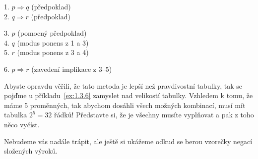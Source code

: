 
\begin{solution}
  \begin{proofbox}
    1. $p \Rightarrow q$ (předpoklad) \\
    2. $q \Rightarrow r$ (předpoklad) 
  \begin{proofbox}
    3. $p$ (pomocný předpoklad) \\
    4. $q$ (modus ponens z 1 a 3) \\
    5. $r$ (modus ponens z 3 a 4)
  \end{proofbox}
    6. $p \Rightarrow r$ (zavedení implikace z 3--5)
  \end{proofbox}
\end{solution}

\begin{definitionbox}
  Abyste opravdu věřili, že tato metoda je lepší než pravdivostní tabulky, tak se pojďme u příkladu~\ref{ex:1.3.6} zamyslet nad velikostí tabulky. Vzhledem k tomu, že máme 5 proměnných, tak abychom dosáhli všech možných kombinací, musí mít tabulka $2^5 = 32$ řádků! Představte si, že je všechny musíte vyplňovat a pak z toho něco vyčíst. 
\end{definitionbox}

Nebudeme vás nadále trápit, ale ještě si ukážeme odkud se berou vzorečky negací složených výroků.

